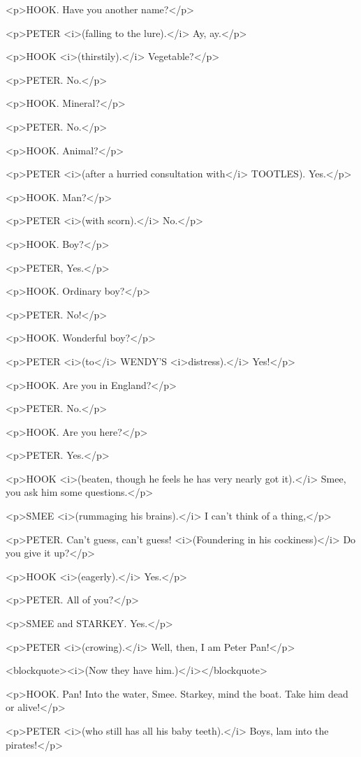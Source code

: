 <p>HOOK. Have you another name?</p>

<p>PETER <i>(falling to the lure).</i> Ay, ay.</p>

<p>HOOK <i>(thirstily).</i> Vegetable?</p>

<p>PETER. No.</p>

<p>HOOK. Mineral?</p>

<p>PETER. No.</p>

<p>HOOK. Animal?</p>

<p>PETER <i>(after a hurried consultation with</i> TOOTLES). Yes.</p>

<p>HOOK. Man?</p>

<p>PETER <i>(with scorn).</i> No.</p>

<p>HOOK. Boy?</p>

<p>PETER, Yes.</p>

<p>HOOK. Ordinary boy?</p>

<p>PETER. No!</p>

<p>HOOK. Wonderful boy?</p>

<p>PETER <i>(to</i> WENDY'S <i>distress).</i> Yes!</p>

<p>HOOK. Are you in England?</p>

<p>PETER. No.</p>

<p>HOOK. Are you here?</p>

<p>PETER. Yes.</p>

<p>HOOK <i>(beaten, though he feels he has very nearly got it).</i>
Smee, you ask him some questions.</p>

<p>SMEE <i>(rummaging his brains).</i> I can't think of a thing,</p>

<p>PETER. Can't guess, can't guess! <i>(Foundering in his
cockiness)</i> Do you give it up?</p>

<p>HOOK <i>(eagerly).</i> Yes.</p>

<p>PETER. All of you?</p>

<p>SMEE and STARKEY. Yes.</p>

<p>PETER <i>(crowing).</i> Well, then, I am Peter Pan!</p>

<blockquote><i>(Now they have him.)</i></blockquote>

<p>HOOK. Pan! Into the water, Smee. Starkey, mind the boat. Take him
dead or alive!</p>

<p>PETER <i>(who still has all his baby teeth).</i> Boys, lam into
the pirates!</p>

